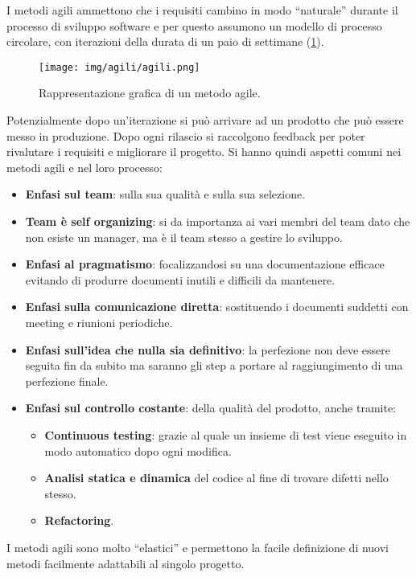 I metodi agili ammettono che i requisiti cambino in modo “naturale” durante il
processo di sviluppo software e per questo assumono un modello di processo
circolare, con iterazioni della durata di un paio di settimane (\ref{fig:agili}).
\begin{figure}[!ht]
      \centering
      \texttt{[image: img/agili/agili.png]}
      \caption{Rappresentazione grafica di un metodo agile.}
      \label{fig:agili}
\end{figure}
Potenzialmente dopo un'iterazione si può arrivare ad un prodotto che può essere
messo in produzione. Dopo ogni rilascio si raccolgono feedback per poter rivalutare
i requisiti e migliorare il progetto. Si hanno quindi aspetti comuni nei metodi
agili e nel loro processo:
\begin{itemize}
      \item \textbf{Enfasi sul team}: sulla sua qualità e sulla sua selezione.
      \item \textbf{Team è self organizing}: si da importanza ai vari membri
            del team dato che non esiste un manager, ma è il team stesso a
            gestire lo sviluppo.
      \item \textbf{Enfasi al pragmatismo}: focalizzandosi su una documentazione
            efficace evitando di produrre documenti inutili e difficili da
            mantenere.
      \item \textbf{Enfasi sulla comunicazione diretta}: sostituendo i documenti
            suddetti con meeting e riunioni periodiche.
      \item \textbf{Enfasi sull'idea che nulla sia definitivo}: la perfezione non
            deve essere seguita fin da subito ma saranno gli step a portare al
            raggiungimento di una perfezione finale.
      \item \textbf{Enfasi sul controllo costante}: della qualità del prodotto,
            anche tramite:
            \begin{itemize}
                  \item \textbf{Continuous testing}: grazie al quale un insieme
                        di test viene eseguito in modo automatico dopo ogni modifica.
                  \item \textbf{Analisi statica e dinamica} del codice al fine
                        di trovare difetti nello stesso.
                  \item \textbf{Refactoring}.
            \end{itemize}
\end{itemize}
I metodi agili sono molto “elastici” e permettono la facile definizione di nuovi
metodi facilmente adattabili al singolo progetto.
